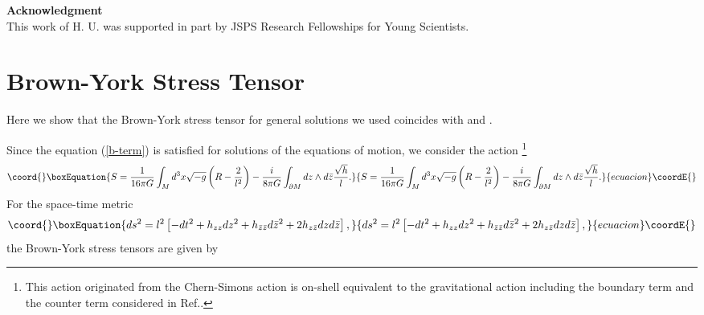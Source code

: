 \documentclass[a4paper,11pt]{article}
\renewcommand{\theequation}{\thesection.\arabic{equation}}
\begin{document}
\vspace{10mm}
\noindent
{\bf \large Acknowledgment} \\
This work of H. U. was supported in part by JSPS Research Fellowships 
for Young Scientists.


\renewcommand{\theequation}{\Alph{section}.\arabic{equation}}
\appendix

\section{Brown-York Stress Tensor}
Here we show that the Brown-York stress tensor \cite{Brown-York}
for general solutions we used coincides with 
\coordHE{} and \coordHE{}.

Since the equation (\ref{b-term}) is satisfied for solutions of 
the equations of motion, we consider the action
\footnote{This action originated from the Chern-Simons action is
on-shell equivalent to the gravitational action including the boundary
term and the counter term considered in Ref.\cite{Brown-York,
Strominger, BBM1}.} 
\begin{equation}\coord{}\boxEquation{
S=\frac{1}{16\pi G}\int_M d^3x \sqrt{-g}\left(R-\frac{2}{l^2}\right)
       -\frac{i}{8\pi G}\int_{\partial M}dz\wedge d\bar{z}
        \frac{\sqrt{h}}{l}.
}{
S=\frac{1}{16\pi G}\int_M d^3x \sqrt{-g}\left(R-\frac{2}{l^2}\right)
       -\frac{i}{8\pi G}\int_{\partial M}dz\wedge d\bar{z}
        \frac{\sqrt{h}}{l}.
}{ecuacion}\coordE{}\end{equation}
For the space-time metric
\begin{equation}\coord{}\boxEquation{
ds^2=l^2\left[-dt^2+h_{zz}dz^2+h_{\bar{z}\bar{z}}d\bar{z}^2
   +2h_{z\bar{z}}dzd\bar{z}\right],
}{
ds^2=l^2\left[-dt^2+h_{zz}dz^2+h_{\bar{z}\bar{z}}d\bar{z}^2
   +2h_{z\bar{z}}dzd\bar{z}\right],
}{ecuacion}\coordE{}\end{equation}
the Brown-York stress tensors are given by 
\end{document}
